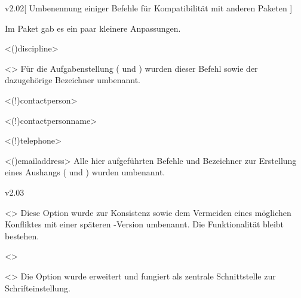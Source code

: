 \begin{Entity}{}
\begin{NoIndexDefault}
\begin{Cessations}{v2.02}[%
  Umbenennung einiger Befehle für Kompatibilität mit anderen Paketen%
]
%
\begin{Entity}{}
Im Paket  gab es ein paar kleinere Anpassungen.
\begin{Cessation}
  {}
  <\Macro(){discipline}>
\begin{Cessation}
  {}
  <>
\printdeclarationlist
%
Für die Aufgabenstellung ( und ) wurden 
dieser Befehl sowie der dazugehörige Bezeichner umbenannt.
\end{Cessation}
\end{Cessation}

\begin{Cessation}
  {}
  <\Macro(!){contactperson}>
\begin{Cessation}
  {}
  <\Term(!){contactpersonname}>
\begin{Cessation}
  {}
  <\Macro(!){telephone}>
\begin{Cessation}
  {}
  <\Macro(){emailaddress}>
\printdeclarationlist
%
Alle hier aufgeführten Befehle und Bezeichner zur Erstellung eines Aushangs 
( und ) wurden umbenannt.
\end{Cessation}
\end{Cessation}
\end{Cessation}
\end{Cessation}
\end{Entity}
\end{Cessations}



\begin{Cessations}{v2.03}
\begin{Cessation}
  {}
  <>
\printdeclarationlist
%
Diese Option wurde zur Konsistenz sowie dem Vermeiden eines möglichen 
Konfliktes mit einer späteren \KOMAScript-Version umbenannt. Die Funktionalität 
bleibt bestehen.
\end{Cessation}

\begin{Cessation}
  {}
  <>
\begin{Cessation}
  {}
  <>
\printdeclarationlist
%
Die Option  wurde erweitert und fungiert als zentrale 
Schnittstelle zur Schrifteinstellung. 
\end{Cessation}
\end{Cessation}


\end{Cessations}
\end{NoIndexDefault}
\end{Entity}
